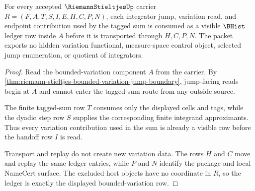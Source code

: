 \begin{theorem}
\label{thm:riemann-stieltjes-bounded-variation-ledger}
For every accepted $\RiemannStieltjesUp$ carrier $R=(F,A,T,S,I,E,H,C,P,N)$, each integrator jump, variation read, and endpoint contribution used by the tagged sum is consumed as a visible $\BHist$ ledger row inside $A$ before it is transported through $H,C,P,N$. The packet exports no hidden variation functional, measure-space control object, selected jump enumeration, or quotient of integrators.
\end{theorem}
\begin{proof}
Read the bounded-variation component $A$ from the carrier. By \autoref{thm:riemann-stieltjes-bounded-variation-jump-boundary}, jump-facing reads begin at $A$ and cannot enter the tagged-sum route from any outside source.

The finite tagged-sum row $T$ consumes only the displayed cells and tags, while the dyadic step row $S$ supplies the corresponding finite integrand approximants. Thus every variation contribution used in the sum is already a visible row before the handoff row $I$ is read.

Transport and replay do not create new variation data. The rows $H$ and $C$ move and replay the same ledger entries, while $P$ and $N$ identify the package and local NameCert surface. The excluded host objects have no coordinate in $R$, so the ledger is exactly the displayed bounded-variation row.
\end{proof}

